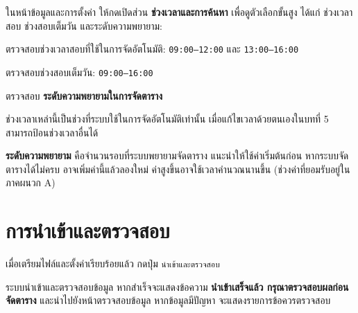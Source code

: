 ในหน้าข้อมูลและการตั้งค่า ให้กดเปิดส่วน \textbf{ช่วงเวลาและการค้นหา}
เพื่อดูตัวเลือกขั้นสูง ได้แก่ ช่วงเวลาสอบ ช่วงสอบเต็มวัน และระดับความพยายาม:

\begin{steps}
  \item ตรวจสอบช่วงเวลาสอบที่ใช้ในการจัดอัตโนมัติ:
        \texttt{09:00--12:00} และ \texttt{13:00--16:00}
  \item ตรวจสอบช่วงสอบเต็มวัน: \texttt{09:00--16:00}
  \item ตรวจสอบ \textbf{ระดับความพยายามในการจัดตาราง}
\end{steps}

ช่วงเวลาเหล่านี้เป็นช่วงที่ระบบใช้ในการจัดอัตโนมัติเท่านั้น
เมื่อแก้ไขเวลาด้วยตนเองในบทที่ 5 สามารถป้อนช่วงเวลาอื่นได้

\textbf{ระดับความพยายาม} คือจำนวนรอบที่ระบบพยายามจัดตาราง
แนะนำให้ใช้ค่าเริ่มต้นก่อน หากระบบจัดตารางได้ไม่ครบ อาจเพิ่มค่านี้แล้วลองใหม่
ค่าสูงขึ้นอาจใช้เวลาคำนวณนานขึ้น (ช่วงค่าที่ยอมรับอยู่ในภาคผนวก A)

\section{การนำเข้าและตรวจสอบ}

เมื่อเตรียมไฟล์และตั้งค่าเรียบร้อยแล้ว กดปุ่ม \texttt{นำเข้าและตรวจสอบ}


\begin{expected}
ระบบนำเข้าและตรวจสอบข้อมูล หากสำเร็จจะแสดงข้อความ \textbf{นำเข้าเสร็จแล้ว กรุณาตรวจสอบผลก่อนจัดตาราง}
และนำไปยังหน้าตรวจสอบข้อมูล หากข้อมูลมีปัญหา จะแสดงรายการข้อควรตรวจสอบ
\end{expected}

